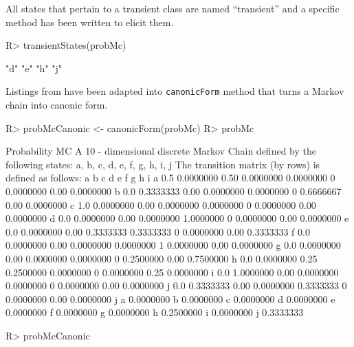 \documentclass[
  nojss]{jss}
\begin{document}
All states that pertain to a transient class are named ``transient'' and a
specific method has been written to elicit them.

\begin{CodeChunk}

\begin{CodeInput}
R> transientStates(probMc)
\end{CodeInput}

\begin{CodeOutput}
[1] "d" "e" "h" "j"
\end{CodeOutput}
\end{CodeChunk}

Listings from \cite{renaldoMatlab} have been adapted into \texttt{canonicForm} method that turns a Markov chain into canonic form.

\begin{CodeChunk}

\begin{CodeInput}
R> probMcCanonic <- canonicForm(probMc)
R> probMc
\end{CodeInput}

\begin{CodeOutput}
Probability MC 
 A  10 - dimensional discrete Markov Chain defined by the following states: 
 a, b, c, d, e, f, g, h, i, j 
 The transition matrix  (by rows)  is defined as follows: 
    a         b    c         d         e f         g    h         i
a 0.5 0.0000000 0.50 0.0000000 0.0000000 0 0.0000000 0.00 0.0000000
b 0.0 0.3333333 0.00 0.0000000 0.0000000 0 0.6666667 0.00 0.0000000
c 1.0 0.0000000 0.00 0.0000000 0.0000000 0 0.0000000 0.00 0.0000000
d 0.0 0.0000000 0.00 0.0000000 1.0000000 0 0.0000000 0.00 0.0000000
e 0.0 0.0000000 0.00 0.3333333 0.3333333 0 0.0000000 0.00 0.3333333
f 0.0 0.0000000 0.00 0.0000000 0.0000000 1 0.0000000 0.00 0.0000000
g 0.0 0.0000000 0.00 0.0000000 0.0000000 0 0.2500000 0.00 0.7500000
h 0.0 0.0000000 0.25 0.2500000 0.0000000 0 0.0000000 0.25 0.0000000
i 0.0 1.0000000 0.00 0.0000000 0.0000000 0 0.0000000 0.00 0.0000000
j 0.0 0.3333333 0.00 0.0000000 0.3333333 0 0.0000000 0.00 0.0000000
          j
a 0.0000000
b 0.0000000
c 0.0000000
d 0.0000000
e 0.0000000
f 0.0000000
g 0.0000000
h 0.2500000
i 0.0000000
j 0.3333333
\end{CodeOutput}

\begin{CodeInput}
R> probMcCanonic
\end{CodeInput}


\end{CodeChunk}
\end{document}
